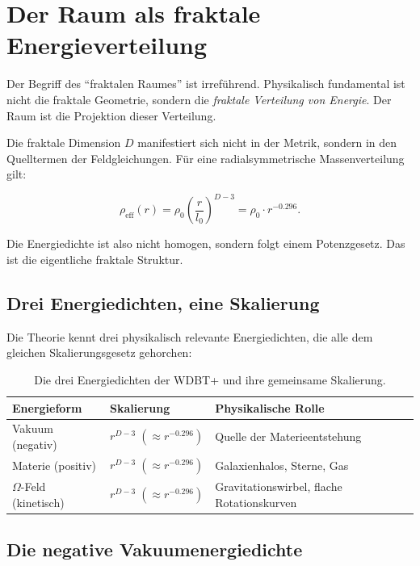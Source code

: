\chapter{Der Raum als fraktale Energieverteilung}

Der Begriff des ``fraktalen Raumes'' ist irreführend. Physikalisch fundamental ist nicht die fraktale Geometrie, sondern die \emph{fraktale Verteilung von Energie}.
Der Raum ist die Projektion dieser Verteilung.

Die fraktale Dimension \(D\) manifestiert sich nicht in der Metrik, sondern in den Quelltermen der Feldgleichungen. Für eine radialsymmetrische Massenverteilung
gilt:

\begin{equation}
\rho_{\text{eff}}(r) = \rho_0 \left( \frac{r}{l_0} \right)^{D-3} = \rho_0 \cdot r^{-0.296}. \tag{2.1}
\end{equation}

Die Energiedichte ist also nicht homogen, sondern folgt einem Potenzgesetz. Das ist die eigentliche fraktale Struktur.

\section{Drei Energiedichten, eine Skalierung}

Die Theorie kennt drei physikalisch relevante Energiedichten, die alle dem gleichen Skalierungsgesetz gehorchen:

\begin{table}[ht]
\centering
\small
\setlength{\tabcolsep}{4pt}
\begin{tabular}{|p{2.8cm}|p{3.0cm}|p{3.8cm}|}
\hline
\textbf{Energieform} & \textbf{Skalierung} & \textbf{Physikalische Rolle} \\
\hline
Vakuum (negativ) & 
\(r^{D-3} \;( \approx r^{-0.296})\) & 
Quelle der Materieentstehung \\
\hline
Materie (positiv) & 
\(r^{D-3} \;( \approx r^{-0.296})\) & 
Galaxienhalos, Sterne, Gas \\
\hline
\(\Omega\)-Feld (kinetisch) & 
\(r^{D-3} \;( \approx r^{-0.296})\) & 
Gravitationswirbel, flache Rotationskurven \\
\hline
\end{tabular}
\caption{Die drei Energiedichten der WDBT+ und ihre gemeinsame Skalierung.}
\end{table}

\section{Die negative Vakuumenergiedichte}

